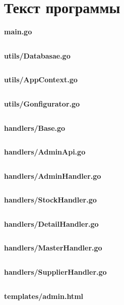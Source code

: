 \documentclass[20pt,a4paper]{report}
\begin{document}
	\chapter{Текст программы}
		\qquad \textbf{main.go} \\
		\small
		\inputminted[tabsize=4, linenos, breaklines]{go}{main.go}
		\large	
		
		\qquad \textbf{utils/Databasae.go} \\
		\small
		\inputminted[tabsize=4, linenos, breaklines]{go}{utils/Databasae.go}
		\large	
		
		\qquad \textbf{utils/AppContext.go} \\
		\small
		\inputminted[tabsize=4, linenos, breaklines]{go}{utils/AppContext.go}
		\large	
		
		\qquad \textbf{utils/Gonfigurator.go} \\
		\small
		\inputminted[tabsize=4, linenos, breaklines]{go}{utils/Gonfigurator.go}
		\large	
		
		\qquad \textbf{handlers/Base.go} \\
		\small
		\inputminted[tabsize=4, linenos, breaklines]{go}{handlers/Base.go}
		\large	
		
		\qquad \textbf{handlers/AdminApi.go} \\
		\small
		\inputminted[tabsize=4, linenos, breaklines]{go}{handlers/AdminApi.go}
		\large	
		
		\qquad \textbf{handlers/AdminHandler.go} \\
		\small
		\inputminted[tabsize=4, linenos, breaklines]{go}{handlers/AdminHandler.go}
		\large	
		
		\qquad \textbf{handlers/StockHandler.go} \\
		\small
		\inputminted[tabsize=4, linenos, breaklines]{go}{handlers/StockHandler.go}
		\large	
		
		\qquad \textbf{handlers/DetailHandler.go} \\
		\small
		\inputminted[tabsize=4, linenos, breaklines]{go}{handlers/DetailHandler.go}
		\large	
		
		\qquad \textbf{handlers/MasterHandler.go} \\
		\small
		\inputminted[tabsize=4, linenos, breaklines]{go}{handlers/MasterHandler.go}
		\large	
		
		\qquad \textbf{handlers/SupplierHandler.go} \\
		\small
		\inputminted[tabsize=4, linenos, breaklines]{go}{handlers/SupplierHandler.go}
		\large	
		
		\qquad \textbf{templates/admin.html} \\
		\small
		\inputminted[tabsize=4, linenos, breaklines]{html}{templates/admin.html}
		\large	
		
\end{document}
